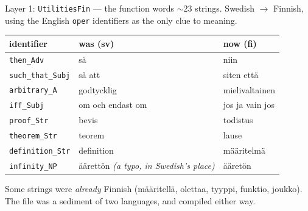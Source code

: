 \documentclass[10pt,aspectratio=169]{beamer}
\newcommand{\bad}[1]{\textcolor{warn}{#1}}
\begin{document}
\begin{frame}{Layer 1: \texttt{UtilitiesFin} --- the function words}
  $\sim$23 strings. Swedish $\rightarrow$ Finnish, using the English \texttt{oper}
  identifiers as the only clue to meaning.

  \vspace{0.5em}
  \small
  \begin{center}
  \begin{tabular}{lll}
    \toprule
    identifier & was (sv) & now (fi) \\
    \midrule
    \texttt{then\_Adv}       & så & niin \\
    \texttt{such\_that\_Subj} & så att & siten että \\
    \texttt{arbitrary\_A}    & godtycklig & mielivaltainen \\
    \texttt{iff\_Subj}       & om och endast om & jos ja vain jos \\
    \texttt{proof\_Str}      & bevis & todistus \\
    \texttt{theorem\_Str}    & teorem & lause \\
    \texttt{definition\_Str} & definition & määritelmä \\
    \texttt{infinity\_NP}    & \bad{äärettön} \emph{(a typo, in Swedish's place)} & ääretön \\
    \bottomrule
  \end{tabular}
  \end{center}

  \vspace{0.5em}
  \footnotesize
  Some strings were \emph{already} Finnish (määritellä, olettaa, tyyppi, funktio,
  joukko). The file was a sediment of two languages, and compiled either way.
\end{frame}
\end{document}
